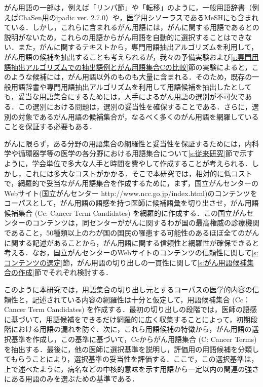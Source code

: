 \documentclass[japanese]{jnlp_1.4}
\begin{document}
がん用語の一部は，例えば「リンパ節」や「転移」のように，一般用語辞書（例えばChaSen用のipadic ver. 2.7.0）や，医学用シソーラスであるMeSH\cite{c5}にも含まれている．しかし，これらに含まれるがん用語には，がんに関する用語であるとの説明がないため，これらの用語からがん用語を自動的に選択することはできない．また，がんに関するテキストから，専門用語抽出アルゴリズム\cite{c6,c7}を利用して，がん用語の候補を抽出することも考えられるが，我々の予備実験および\ref{s:専門用語抽出アルゴリズムでの抽出語例とがん用語集合Cの比較}節の実験によると，このような候補には，がん用語以外のものも大量に含まれる．そのため，既存の一般用語辞書や専門用語抽出アルゴリズムを利用して用語候補を抽出したとしても，妥当な用語集合にするためには，人手によるがん用語の選別が不可欠である．この選別における問題は，選別の妥当性を確保することである．さらに，選別の対象であるがん用語の候補集合が，なるべく多くのがん用語を網羅していることを保証する必要もある．

がんに限らず，ある分野の用語集合の網羅性と妥当性を保証するためには，内科学や循環器学等の医学の各分野における用語集合について\ref{s:従来研究}節で示すように，学会単位で多大な人手と時間を費やして作成することが考えられる．しかし，これには多大なコストがかかる．そこで本研究では，相対的に低コストで，網羅的で妥当ながん用語集合を作成するために，まず，国立がんセンターのWebサイト\nocite{c8}(国立がんセンター http://www.ncc.go.jp/index.html)のコンテンツをコーパスとして，がん用語の語感を持つ医師に候補語彙を切り出させ，がん用語候補集合 (Cc: Cancer Term Candidates) を網羅的に作成する．この国立がんセンターのコンテンツは，同センターががんに関するわが国の最高権威の診療機関であること，50種類以上のわが国の国民の罹患する可能性のあるほぼ全てのがんに関する記述があることから，がん用語に関する信頼性と網羅性が確保できると考える．なお，国立がんセンターのWebサイトのコンテンツの信頼性に関して\ref{s:コンテンツの選定}節，がん用語の切り出しの一貫性に関して\ref{s:がん用語候補集合の作成}節でそれぞれ検討する．



このように本研究では，用語集合の切り出し元とするコーパスの医学的内容の信頼性と，記述されている内容の網羅性は十分と仮定して，用語候補集合 (Cc：Cancer Term Candidates) を作成する．最初の切り出しの段階では，医師の語感に基づいて，用語候補をできるだけ網羅的に広く収集することによって，初期段階における用語の漏れを防ぐ．次に，これら用語候補の特徴から，がん用語の選択基準を作成し，この基準に基づいて，Ccからがん用語集合 (C: Cancer Terms) を抽出する．最後に，他の医師に選択基準を説明し，評価用の用語候補を分類してもらうことにより，選択基準の妥当性を評価する．ここで，この選択基準は，上で述べたように，病名などの中核的意味を示す用語から一定以内の関連の強さにある用語のみを選ぶための基準である．
\end{document}
